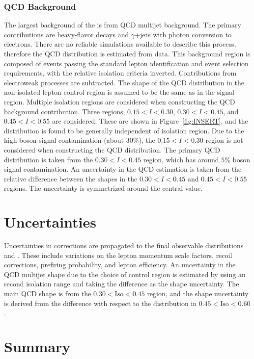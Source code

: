  
\subsubsection{QCD Background}\label{ch:w:qcd}
The largest background of the \W is from QCD multijet background. The primary contributions are heavy-flavor decays and $\gamma$+jets with photon conversion to electrons. There are no reliable simulations available to describe this process, therefore the QCD  \mt distribution is estimated from data. This background region is composed of events passing the standard lepton identification and event selection requirements, with the relative isolation criteria inverted. Contributions from electroweak processes are subtracted. The shape of the QCD \mt distribution in the non-isolated lepton control region is assumed to be the same as in the signal region. Multiple isolation regions are considered when constructing the QCD background contribution. Three regions, $0.15 < I < 0.30$, $0.30 < I < 0.45$, and $0.45 < I < 0.55$ are considered. These are shown in Figure~\ref{fig:INSERT}, and the \mt distribution is found to be generally independent of isolation region. Due to the high \W boson signal contamination (about $30\%$), the $0.15 < I < 0.30$ region is not considered when constructing the QCD \mt distribution. The primary QCD \mt distribution is taken from the $0.30 < I < 0.45$ region, which has around $5\%$ \W boson signal contamination. An uncertainty in the QCD estimation is taken from the relative difference between the \mt shapes in the $0.30 < I < 0.45$ and $0.45 < I < 0.55$ regions. The uncertainty is symmetrized around the central value.

\section{Uncertainties}\label{ch:unc}
Uncertainties in corrections are propagated to the final observable distributions \mt and \mll. These include variations on the lepton momentum scale factors, recoil corrections, prefiring probability, and lepton efficiency.
An uncertainty in the QCD multijet shape due to the choice of control region is estimated by using an second isolation range and taking the difference as the shape uncertainty. The main QCD \mt shape is from the $0.30 < \mathrm{Iso} < 0.45$ region, and the shape uncertainty is derived from the difference with respect to the \mt distribution in $0.45 < \mathrm{Iso} < 0.60$.

\section{Summary}

